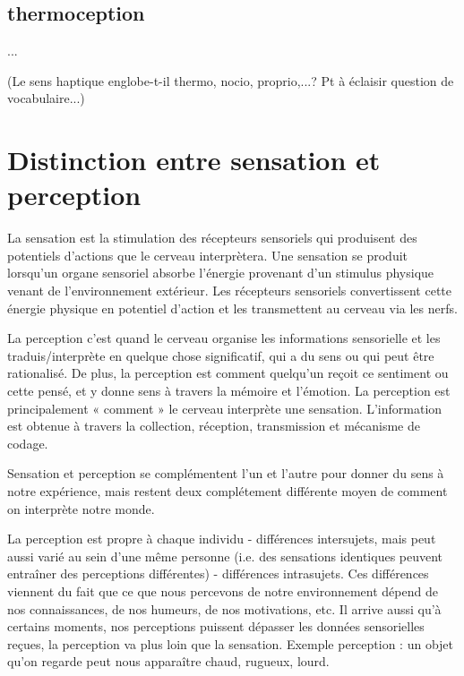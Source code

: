 \subsection{thermoception}
...

(Le sens haptique englobe-t-il thermo, nocio, proprio,...? Pt à éclaisir question de vocabulaire...)

\section{Distinction entre sensation et perception}
La sensation est la stimulation des récepteurs sensoriels qui produisent des potentiels d’actions que le cerveau interprètera. Une sensation se produit lorsqu’un organe sensoriel absorbe l’énergie provenant d’un stimulus physique venant de l’environnement extérieur. Les récepteurs sensoriels convertissent cette énergie physique en  potentiel d’action et les transmettent au cerveau via les nerfs.\par
La perception c’est quand le cerveau organise les informations sensorielle et les traduis/interprète en quelque chose significatif, qui a du sens ou qui peut être rationalisé. De plus, la perception est comment quelqu’un reçoit ce sentiment ou cette pensé, et y donne sens à travers la mémoire et l’émotion. La perception est principalement « comment » le cerveau interprète une sensation. L’information est obtenue à travers la collection, réception, transmission et mécanisme de codage.\par
Sensation et perception se complémentent l’un et l’autre pour donner du sens à notre expérience, mais restent deux complétement différente moyen de comment on interprète notre monde.\par
La perception est propre à chaque individu - différences intersujets, mais peut aussi varié au sein d’une même personne (i.e. des sensations identiques peuvent entraîner des perceptions différentes) - différences intrasujets. Ces différences viennent du fait que ce que nous percevons de notre environnement dépend de nos connaissances, de nos humeurs, de nos motivations, etc. Il arrive aussi qu’à certains moments, nos perceptions puissent dépasser les données sensorielles reçues, la perception va plus loin que la sensation. Exemple perception : un objet qu’on regarde peut nous apparaître chaud, rugueux, lourd.\par


